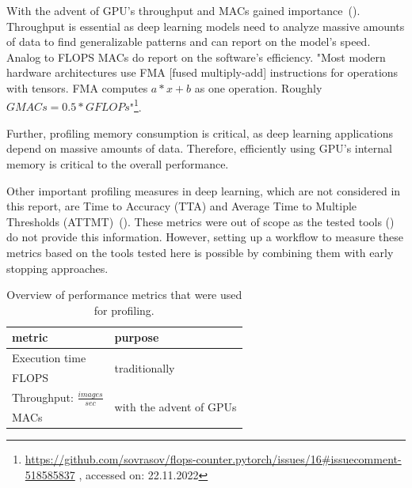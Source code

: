 \documentclass[12pt, a4paper, hidelinks]{article}
\begin{document}
With the advent of \ac{GPU}'s throughput and \acf{MACs} gained importance~(\cite{verma_2019_metrics-ml-benchmarking}).
Throughput is essential as deep learning models need to analyze massive amounts of data to find generalizable patterns and can report on the model's speed.
Analog to \ac{FLOPS} \ac{MACs} do report on the software's efficiency. "Most modern hardware architectures use FMA [fused multiply-add] instructions for operations with tensors. FMA computes $a*x+b$ as one operation. Roughly $GMACs = 0.5 * GFLOPs$"\footnote{\url{https://github.com/sovrasov/flops-counter.pytorch/issues/16\#issuecomment-518585837} , accessed on: 22.11.2022}.

Further, profiling memory consumption is critical, as deep learning applications depend on massive amounts of data. Therefore, efficiently using \ac{GPU}'s internal memory is critical to the overall performance.

Other important profiling measures in deep learning, which are not considered in this report, are Time to Accuracy (TTA) and Average Time to Multiple Thresholds (ATTMT)~(\cite{verma_2019_metrics-ml-benchmarking}). These metrics were out of scope as the tested tools () do not provide this information. However, setting up a workflow to measure these metrics based on the tools tested here is possible by combining them with early stopping approaches.

\begin{table}[H]
\centering
\begin{tabular}{@{}ll@{}}
\toprule
metric                                                                                 & purpose                        \\ \midrule
Execution time                                                                         & \multirow{2}{*}{traditionally} \\
FLOPS                                                                                  &                                \\ \midrule
Throughput: $\frac{images}{sec}$                                                       & \multirow{2}{*}{with the advent of GPUs} \\
MACs                                                                                   &                                \\ \bottomrule
\end{tabular}
\caption[Overview of performance metrics]{Overview of performance metrics that were used for profiling.}
\label{tab:metrics}
\end{table}
\end{document}
